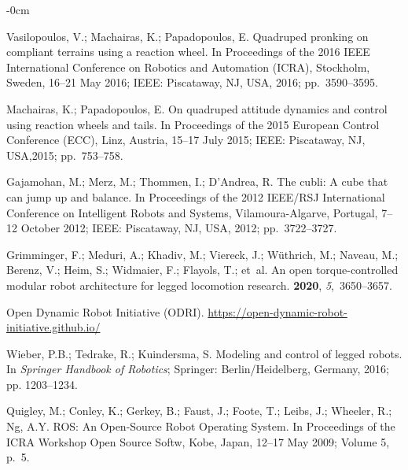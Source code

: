 \documentclass[sensors,article,accept,pdftex,moreauthors]{Definitions/mdpi}
\begin{document}
\begin{adjustwidth}{-\extralength}{0cm}
\begin{thebibliography}{999}
Vasilopoulos, V.; Machairas, K.; Papadopoulos, E.
\newblock Quadruped pronking on compliant terrains using a reaction wheel.
\newblock In Proceedings of the 2016 IEEE International Conference on Robotics
  and Automation (ICRA), Stockholm, Sweden, 16--21 May 2016; IEEE: Piscataway, NJ, USA,  2016; pp.~3590--3595.

Machairas, K.; Papadopoulos, E.
\newblock On quadruped attitude dynamics and control using reaction wheels and
  tails.
\newblock In Proceedings of the 2015 European Control Conference (ECC), Linz, Austria, 15--17 July 2015; IEEE: Piscataway, NJ, USA,2015; pp.~753--758.

Gajamohan, M.; Merz, M.; Thommen, I.; D'Andrea, R.
\newblock The cubli: A cube that can jump up and balance.
\newblock In Proceedings of the 2012 IEEE/RSJ International Conference on
  Intelligent Robots and Systems, Vilamoura-Algarve, Portugal, 7--12 October 2012; IEEE: Piscataway, NJ, USA,  2012; pp.~3722--3727.

Grimminger, F.; Meduri, A.; Khadiv, M.; Viereck, J.; W{\"u}thrich, M.; Naveau,
  M.; Berenz, V.; Heim, S.; Widmaier, F.; Flayols, T.;  et~al.
\newblock An open torque-controlled modular robot architecture for legged
  locomotion research.
 {\bf 2020}, {\em
  5},~3650--3657.

{Open Dynamic Robot Initiative (ODRI)}.
\newblock \url{https://open-dynamic-robot-initiative.github.io/} %


Wieber, P.B.; Tedrake, R.; Kuindersma, S.
\newblock Modeling and control of legged robots. In {\em Springer Handbook of
  Robotics}; Springer: Berlin/Heidelberg, Germany,  2016; pp. 1203--1234.

Quigley, M.; Conley, K.; Gerkey, B.; Faust, J.; Foote, T.; Leibs, J.; Wheeler,
  R.; Ng, A.Y. 
\newblock ROS: An Open-Source Robot Operating System.
\newblock In Proceedings of the ICRA Workshop Open Source Softw, Kobe, Japan,  12--17 May 2009; Volume 5, p.~5.


\end{thebibliography}
\end{adjustwidth}
\end{document}
